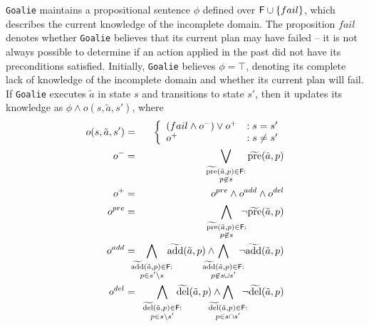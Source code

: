 \documentclass[letterpaper]{article}
\def\goalie{{\tt Goalie}}
\begin{document}
\goalie{} maintains a propositional sentence $\phi$ defined over ${\sf
F} \cup \{fail\}$, which describes the current knowledge of the
incomplete domain.  The proposition $fail$ denotes whether \goalie{} believes
that its current plan may have failed -- it is not always possible to determine
if an action applied in the past did not have its preconditions satisfied.  Initially,
\goalie{} believes $\phi = \top$, denoting its complete lack of knowledge of the
incomplete domain and whether its current plan will fail.    If \goalie{}
executes  $\tilde{a}$ in state $s$ and transitions to state $s'$, then it 
updates its knowledge as $\phi \wedge o(s, \tilde{a}, s')$, where
\noindent \begin{eqnarray}
o(s, \tilde{a}, s') &=& \left\{ \begin{array}{ll}
(fail \wedge o^-) \vee  o^+  &: s = s'\\
o^+  & : s \not= s'
\end{array}\right. \label{eqn:update}\\
o^- &=& \bigvee\limits_{\substack{\widetilde{\text{pre}}(\tilde{a},p) \in {\sf F}:\\ p \not\in s} } \widetilde{\text{pre}}(\tilde{a},p) \label{eqn:update1} \\
o^+ &=& o^{pre} \wedge o^{add} \wedge o^{del}\label{eqn:update2}\\
o^{pre} &=& \bigwedge\limits_{\substack{\widetilde{\text{pre}}(\tilde{a},p) \in
{\sf F}:\\ p \not\in s} }\hspace*{-0.25cm}\neg \widetilde{\text{pre}}(\tilde{a},p)\label{eqn:update3}  \\ o^{add} &=&  \hspace*{-.5cm}\bigwedge\limits_{\substack{\widetilde{\text{add}}(\tilde{a},p) \in {\sf F}:\\ p\in s'\backslash s} }\hspace*{-0.25cm}\widetilde{\text{add}}(\tilde{a},p)   \wedge  \hspace*{-0.5cm}\bigwedge\limits_{\substack{\widetilde{\text{add}}(\tilde{a},p) \in {\sf F}: \\ p \not\in  s\cup s'}} \hspace*{-0.25cm}\neg \widetilde{\text{add}}(\tilde{a},p)   \label{eqn:update4}\\
o^{del} &=& \hspace*{-.5cm} \bigwedge\limits_{\substack{\widetilde{\text{del}}(\tilde{a},p) \in {\sf F}: \\p \in s \backslash s'}} \hspace*{-0.25cm}\widetilde{\text{del}}(\tilde{a},p)  \wedge  \hspace*{-0.5cm}\bigwedge\limits_{\substack{\widetilde{\text{del}}(\tilde{a},p) \in {\sf F}:\\ p \in s\cap s'}} \hspace*{-0.25cm}\neg \widetilde{\text{del}}(\tilde{a},p)  \label{eqn:update5}
\end{eqnarray}
\end{document}
